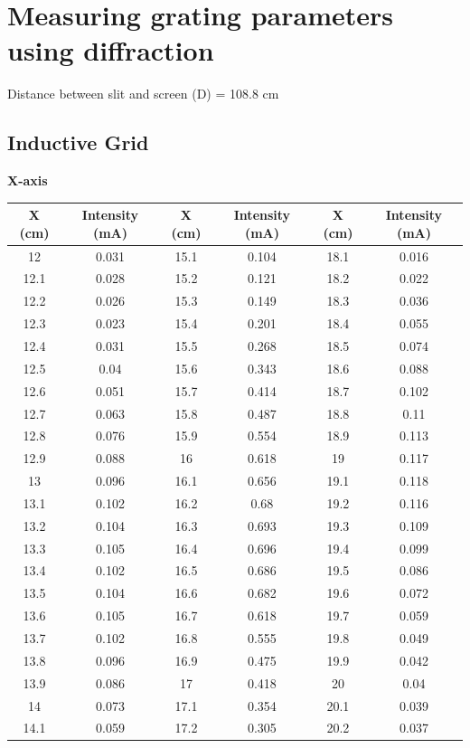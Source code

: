 \documentclass[12pt]{report}
\begin{document}
\newpage
\section{Measuring grating parameters using diffraction}
Distance between slit and screen (D) = 108.8 cm

\subsection{Inductive Grid}
\textbf{X-axis}
\begin{center}
	\begin{tabular}{ |c|c|c|c|c|c| } 
		\hline
		X (cm) & Intensity (mA) & X (cm) & Intensity (mA) & X (cm) & Intensity (mA) \\ 
		\hline
12   & 0.031 & 15.1 & 0.104 & 18.1 & 0.016 \\
12.1 & 0.028 & 15.2 & 0.121 & 18.2 & 0.022 \\
12.2 & 0.026 & 15.3 & 0.149 & 18.3 & 0.036 \\
12.3 & 0.023 & 15.4 & 0.201 & 18.4 & 0.055 \\
12.4 & 0.031 & 15.5 & 0.268 & 18.5 & 0.074 \\
12.5 & 0.04  & 15.6 & 0.343 & 18.6 & 0.088 \\
12.6 & 0.051 & 15.7 & 0.414 & 18.7 & 0.102 \\
12.7 & 0.063 & 15.8 & 0.487 & 18.8 & 0.11  \\
12.8 & 0.076 & 15.9 & 0.554 & 18.9 & 0.113 \\
12.9 & 0.088 & 16   & 0.618 & 19   & 0.117 \\
13   & 0.096 & 16.1 & 0.656 & 19.1 & 0.118 \\
13.1 & 0.102 & 16.2 & 0.68  & 19.2 & 0.116 \\
13.2 & 0.104 & 16.3 & 0.693 & 19.3 & 0.109 \\
13.3 & 0.105 & 16.4 & 0.696 & 19.4 & 0.099 \\
13.4 & 0.102 & 16.5 & 0.686 & 19.5 & 0.086 \\
13.5 & 0.104 & 16.6 & 0.682 & 19.6 & 0.072 \\
13.6 & 0.105 & 16.7 & 0.618 & 19.7 & 0.059 \\
13.7 & 0.102 & 16.8 & 0.555 & 19.8 & 0.049 \\
13.8 & 0.096 & 16.9 & 0.475 & 19.9 & 0.042 \\
13.9 & 0.086 & 17   & 0.418 & 20   & 0.04  \\
14   & 0.073 & 17.1 & 0.354 & 20.1 & 0.039 \\
14.1 & 0.059 & 17.2 & 0.305 & 20.2 & 0.037 \\

\end{tabular}
\end{center}
\end{document}
